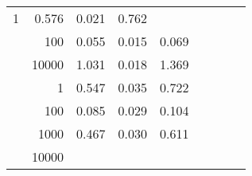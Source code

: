 \begin{table}
\begin{tabular}{rrrrrrrrr}
					
					 
					\multirow{ 1 }{*}{ 1 } &
					
						
							    
							    
	                           0.576 & 0.021 & 0.762  \\
	                
	            
					 &  
					 
					\multirow{ 1 }{*}{ 100 } &
					
						
							    
							    
	                           0.055 & 0.015 & 0.069  \\
	                
	            
					 &  
					 
					\multirow{ 1 }{*}{ 10000 } &
					
						
							    
							    
	                           1.031 & 0.018 & 1.369  \\
	                
	            
	        
				\noalign{\smallskip}\hline
				\multirow{ 4 }{*}{ 500000 } &
				
					
					 
					\multirow{ 1 }{*}{ 1 } &
					
						
							    
							    
	                           0.547 & 0.035 & 0.722  \\
	                
	            
					 &  
					 
					\multirow{ 1 }{*}{ 100 } &
					
						
							    
							    
	                           0.085 & 0.029 & 0.104  \\
	                
	            
					 &  
					 
					\multirow{ 1 }{*}{ 1000 } &
					
						
							    
							    
	                           0.467 & 0.030 & 0.611  \\
	                
	            
					 &  
					 
					\multirow{ 1 }{*}{ 10000 } &
					

\end{tabular}
\end{table}
